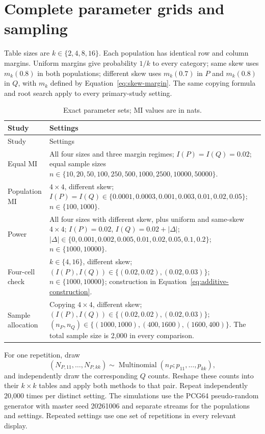 \section{Complete parameter grids and sampling}

Table sizes are \(k\in\{2,4,8,16\}\). Each population has identical
row and column margins. Uniform margins give probability \(1/k\) to
every category; same skew uses \(m_k(0.8)\) in both populations; different
skew uses \(m_k(0.7)\) in \(P\) and \(m_k(0.8)\) in \(Q\), with
\(m_k\) defined by Equation~\eqref{eq:skew-margin}. The same copying
formula and root search apply to every primary-study setting.

\begin{longtable}{@{}>{\raggedright\arraybackslash}p{}>{\raggedright\arraybackslash}p{}@{}}
\caption{Exact parameter sets; MI values are in nats.}\label{tab:exact-grids}\\
\toprule Study & Settings\\\midrule\endfirsthead
\toprule Study & Settings\\\midrule\endhead
Equal MI & All four sizes and three margin regimes;
\(I(P)=I(Q)=0.02\); equal sample sizes
\(n\in\{10,20,50,100,250,500,1000,2500,10000,50000\}\).\\
Population MI & \(4\times4\), different skew;
\(I(P)=I(Q)\in\{0.0001,0.0003,0.001,0.003,0.01,0.02,0.05\}\);
\(n\in\{100,1000\}\).\\
Power & All four sizes with different skew, plus uniform and same-skew
\(4\times4\); \(I(P)=0.02\), \(I(Q)=0.02+|\Delta|\);
\(|\Delta|\in\{0,0.001,0.002,0.005,0.01,0.02,0.05,0.1,0.2\}\);
\(n\in\{1000,10000\}\).\\
Four-cell check & \(k\in\{4,16\}\), different skew;
\((I(P),I(Q))\in\{(0.02,0.02),(0.02,0.03)\}\);
\(n\in\{1000,10000\}\); construction in
Equation~\eqref{eq:additive-construction}.\\
Sample allocation & Copying \(4\times4\), different skew;
\((I(P),I(Q))\in\{(0.02,0.02),(0.02,0.03)\}\);
\((n_P,n_Q)\in\{(1000,1000),(400,1600),(1600,400)\}\).
The total sample size is 2,000 in every comparison.\\
\bottomrule
\end{longtable}

For one repetition, draw
\begin{equation}
 (N_{P,11},\ldots,N_{P,kk})\sim\operatorname{Multinomial}
      (n_P;p_{11},\ldots,p_{kk}),
\end{equation}
and independently draw the corresponding \(Q\) counts.
Reshape these counts into their \(k\times k\) tables and apply both
methods to that pair. Repeat independently 20,000 times per distinct
setting. The simulations use the PCG64 pseudo-random generator with master
seed 20261006 and separate streams for the populations and settings.
Repeated settings use one set of repetitions in every relevant display.

